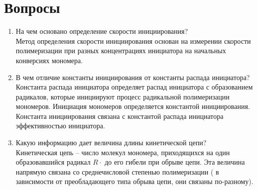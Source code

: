 \documentclass[12pt]{article}
\begin{document}
\section{Вопросы}
\begin{enumerate}
	\item На чем основано определение скорости инициирования? \\
	Метод определения скорости инициирования основан на измерении скорости полимеризации при разных концентрациях инициатора на начальных конверсиях мономера.
	\item В чем отличие константы инициирования от константы распада инициатора? \\
	Константа распада инициатора определяет распад инициатора с образованием радикалов, которые инициируют процесс радикальной полимеризации мономеров. Инициация мономеров определяется константой инициирования. Константа инициирования связана с константой распада инициатора эффективностью инициатора.
	\item Какую информацию дает величина длины кинетической цепи? \\
	Кинетическая цепь -- число молекул мономера, приходящихся на один образовавшийся радикал $R\cdot$  до его гибели при обрыве цепи. Эта величина напрямую связана со среднечисловой степенью полимеризации ( в зависимости от преобладающего типа обрыва цепи, они связаны по-разному). 
\end{enumerate}
\end{document}
